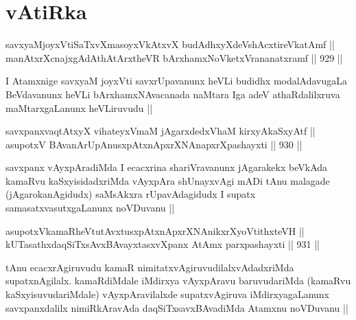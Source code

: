 \section*{vAtiRka}

\begin{shl}
savxyaMjoyxVtiSaTxvXmasoyxVkAtxvX budAdhxyXdeVshAcxtireVkatAmf || \\
manAtxrXcnajxgAdAthAtArxtheVR bArxhamxNoVketxVrananatxramf ||  929 ||  
\end{shl}

\begin{artha}
I Atamxnige savxyaM joyxVti savxrUpavanunx heVLi budidhx modalAdavugaLa BeVdavanunx heVLi bArxhamxNAvacanada naMtara Iga adeV athaRdalilxruva maMtarxgaLanunx heVLiruvudu ||
\end{artha}


\begin{shl}
savxpanxvaqtAtxyX vihateyxVmaM jAgarxdedxVhaM kirxyAkaSxyAtf || \\
asupotxV BAvanArUpAnusxpAtxnApxrXNAnapxrXpashayxti ||  930 ||  
\end{shl}

\begin{artha}
savxpanx vAyxpAradiMda I ecacxrina shariVravanunx jAgarakekx beVkAda kamaRvu kaSxyisidadxriMda vAyxpAra shUnayxvAgi mADi tAnu malagade (jAgarokanAgidudx) saMsAkxra rUpavAdagidudx I supatx samasatxvasutxgaLanunx noVDuvanu ||
\end{artha}


\begin{shl}
asupotxV\s kamaRheVtutAvxtusxpAtxnApxrXNAnikxrXyoVtithxteVH ||  \\
kUTasathxdaqSiTxsAvxBAvayxtasxvXpanx AtAmx parxpashayxti ||  931 ||  
\end{shl}

\begin{artha}
tAnu ecacxrAgiruvudu kamaR nimitatxvAgiruvudilalxvAdadxriMda supatxnAgilalx. kamaRdiMdale iMdirxya vAyxpAravu baruvudariMda (kamaRvu kaSxyisuvudariMdale) vAyxpAravilalxde supatxvAgiruva iMdirxyagaLanunx savxpanxdalilx nimiRkAravAda daqSiTxsavxBAvadiMda Atamxnu noVDuvanu ||
\end{artha}


